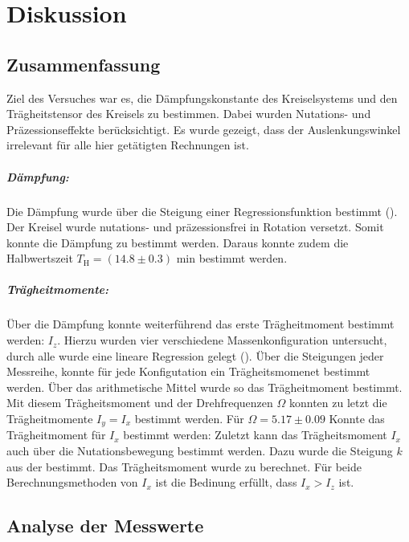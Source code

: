 \chapter{Diskussion}
\label{ch:Diskussion}

\section{Zusammenfassung}
\label{sec:Zusammenfassung}
Ziel des Versuches war es, die Dämpfungskonstante des Kreiselsystems und den Trägheitstensor des Kreisels zu bestimmen. Dabei wurden Nutations- und Präzessionseffekte berücksichtigt.
Es wurde gezeigt, dass der Auslenkungswinkel irrelevant für alle hier getätigten Rechnungen ist.

\paragraph{Dämpfung:}
Die Dämpfung wurde über die Steigung einer Regressionsfunktion bestimmt (). Der Kreisel wurde nutations- und präzessionsfrei in Rotation versetzt. Somit konnte die Dämpfung zu
bestimmt werden. Daraus konnte zudem die Halbwertszeit $T_\text{H} = (14.8 \pm 0.3)$ min bestimmt werden. 

\paragraph{Trägheitmomente:}
Über die Dämpfung konnte weiterführend das erste Trägheitmoment bestimmt werden: $I_z$. Hierzu wurden vier verschiedene Massenkonfiguration untersucht, durch alle wurde eine lineare Regression gelegt ().
Über die Steigungen jeder Messreihe, konnte für jede Konfigutation ein Trägheitsmomenet bestimmt werden. Über das arithmetische Mittel wurde so das Trägheitmoment
bestimmt. 
Mit diesem Trägheitsmoment und der Drehfrequenzen $\Omega$ konnten zu letzt die Trägheitmomente $I_y = I_x$ bestimmt werden. Für $\Omega = 5.17\pm0.09$ Konnte das Trägheitmoment für $I_x$ bestimmt werden:
Zuletzt kann das Trägheitsmoment  $I_x$ auch über die Nutationsbewegung bestimmt werden. Dazu wurde die Steigung $k$ aus der  bestimmt. Das Trägheitsmoment  wurde zu
berechnet. Für beide Berechnungsmethoden von $I_x$ ist die Bedinung erfüllt, dass $I_x > I_z$ ist. 

\section{Analyse der Messwerte}
\label{sec:Analyse}
